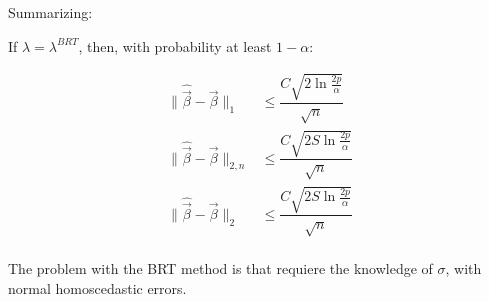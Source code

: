 Summarizing:

If $\lambda = \lambda^{BRT}$, then, with probability at least $1 - \alpha$:

\begin{align*}
\|\hat{\Vec{\beta}} - \Vec{\beta}\|_1 &\leq \dfrac{C \sqrt{2 \ln \frac{2p}{\alpha}}}{\sqrt{n}} \\ 
\|\hat{\Vec{\beta}} - \Vec{\beta}\|_{2,n} &\leq \dfrac{C \sqrt{2 S \ln \frac{2p}{\alpha}}}{\sqrt{n}} \\ 
\|\hat{\Vec{\beta}} - \Vec{\beta}\|_{2} &\leq \dfrac{C \sqrt{2 S \ln \frac{2p}{\alpha}}}{\sqrt{n}} \\ 
\end{align*}

The problem with the BRT method is that requiere the knowledge of $\sigma$, with normal homoscedastic errors. 